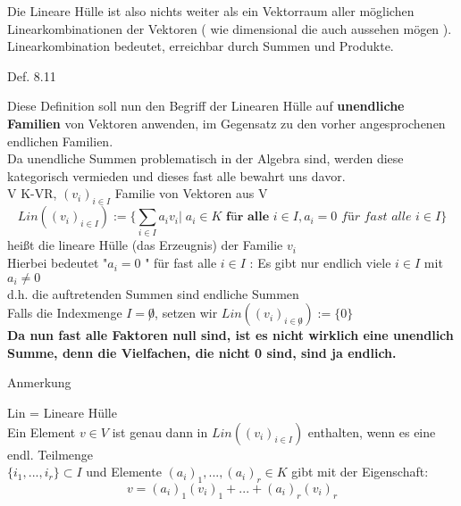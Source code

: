 \documentclass[smallheadings,12pt,a4paper]{scrartcl}
\begin{document}
Die Lineare Hülle ist also nichts weiter als ein Vektorraum aller möglichen Linearkombinationen der Vektoren ( wie dimensional die auch aussehen mögen ). Linearkombination bedeutet, erreichbar durch Summen und Produkte. 

\item[Def. 8.11]

Diese Definition soll nun den Begriff der Linearen Hülle auf \textbf{unendliche Familien} von Vektoren anwenden, im Gegensatz zu den vorher angesprochenen endlichen Familien. \\

Da unendliche Summen problematisch in der Algebra sind, werden diese kategorisch vermieden und dieses fast alle bewahrt uns davor. \\

V K-VR, $(v_i)_{i \in I}$ Familie von Vektoren aus V \\

$$\textit{Lin}((v_i)_{i \in I}) := \{\sum_{i \in I} a_i v_i | \; a_i \in K \textbf{ für alle } i \in I, a_i = 0 \textit{ für fast alle } i \in I  \}$$
heißt die lineare Hülle (das Erzeugnis) der Familie $v_i$ \\

Hierbei bedeutet "$a_i = 0$ " für fast alle $i\in I$ : Es gibt nur endlich viele $i \in I $ mit $a_i \neq 0$ \\

d.h. die auftretenden Summen sind endliche Summen \\

Falls die Indexmenge $I = \not 0 $, setzen wir $\textit{Lin}((v_i)_{i \in \not 0}):= \{0\}$ \\

\textbf{Da nun fast alle Faktoren null sind, ist es nicht wirklich eine unendlich Summe, denn die Vielfachen, die nicht 0 sind, sind ja endlich.}

\newpage

\item[Anmerkung]

Lin = Lineare Hülle \\

Ein Element $ v\in V$ ist genau dann in $\textit{Lin}((v_i)_{i \in I})$ enthalten, wenn es eine endl. Teilmenge \\
$\{i_1,...,i_r\} \subset I $  und Elemente $(a_{i})_1,...,(a_{i})_r \in K $ gibt mit der Eigenschaft: \\

$$ v = (a_{i})_1 (v_{i})_1 + ... + (a_{i})_r (v_{i})_r $$
\end{document}
